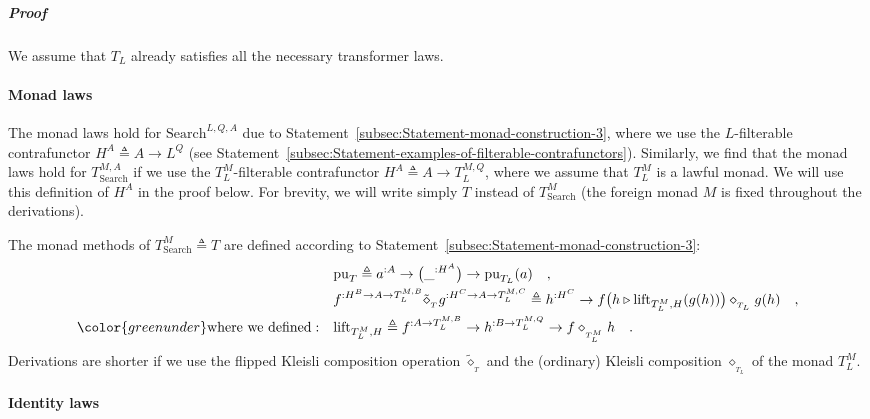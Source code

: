 \subparagraph{Proof}

We assume that $T_{L}$ already satisfies all the necessary transformer
laws.

\paragraph{Monad laws}

The monad laws hold for $\text{Search}^{L,Q,A}$ due to Statement~\ref{subsec:Statement-monad-construction-3},
where we use the $L$-filterable contrafunctor $H^{A}\triangleq A\rightarrow L^{Q}$
(see Statement~\ref{subsec:Statement-examples-of-filterable-contrafunctors}).
Similarly, we find that the monad laws hold for $T_{\text{Search}}^{M,A}$
if we use the $T_{L}^{M}$-filterable contrafunctor $H^{A}\triangleq A\rightarrow T_{L}^{M,Q}$,
where we assume that $T_{L}^{M}$ is a lawful monad. We will use this
definition of $H^{A}$ in the proof below. For brevity, we will write
simply $T$ instead of $T_{\text{Search}}^{M}$ (the foreign monad
$M$ is fixed throughout the derivations). 

The monad methods of $T_{\text{Search}}^{M}\triangleq T$ are defined
according to Statement~\ref{subsec:Statement-monad-construction-3}:
\begin{align*}
 & \text{pu}_{T}\triangleq a^{:A}\rightarrow\big(\_^{:H^{A}}\big)\rightarrow\text{pu}_{T_{L}}(a)\quad,\\
 & f^{:H^{B}\rightarrow A\rightarrow T_{L}^{M,B}}\tilde{\diamond}_{_{T}}g^{:H^{C}\rightarrow A\rightarrow T_{L}^{M,C}}\triangleq h^{:H^{C}}\rightarrow f\big(h\triangleright\text{lift}_{T_{L}^{M},H}(g(h))\big)\diamond_{_{T_{L}}}g(h)\quad,\\
{\color{greenunder}\text{where we defined}:}\quad & \text{lift}_{T_{L}^{M},H}\triangleq f^{:A\rightarrow T_{L}^{M,B}}\rightarrow h^{:B\rightarrow T_{L}^{M,Q}}\rightarrow f\diamond_{_{T_{L}^{M}}}h\quad.
\end{align*}
Derivations are shorter if we use the flipped Kleisli composition
operation $\tilde{\diamond}_{_{T}}$ and the (ordinary) Kleisli composition
$\diamond_{_{T_{L}}}$ of the monad $T_{L}^{M}$.

\paragraph{Identity laws}

